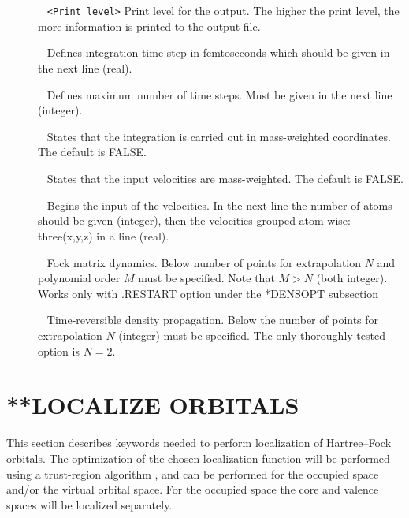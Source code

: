 \begin{description}
\item[]\verb| | \newline
\verb|<Print level>|\newline
Print level for the output. The higher the print level, the more information
is printed to the output file.
\item[]\verb| | \newline
Defines integration time step in femtoseconds which should be given in the next line (real).
\item[]\verb| | \newline
Defines maximum number of time steps. Must be given in the next line (integer).
\item[]\verb| | \newline 
States that the integration is carried out in mass-weighted coordinates. The default is FALSE.
\item[]\verb| | \newline 
States that the input velocities are mass-weighted. The default is FALSE.
\item[]\verb| | \newline 
Begins the input of the velocities. In the next line the number of atoms should be given (integer),
then the velocities grouped atom-wise: three(x,y,z) in a line (real).
\item[]\verb| | \newline 
Fock matrix dynamics. Below number of points for extrapolation $N$ and polynomial order $M$ must
be specified. Note that $M>N$ (both integer). Works only with .RESTART option under the *DENSOPT subsection
\item[]\verb| | \newline 
Time-reversible density propagation. Below the number of points for extrapolation $N$ (integer)  must be specified.
The only thoroughly tested option is $N=2$.

\end{description}


\section{**LOCALIZE ORBITALS}\label{subsec:orbloc}

This section describes keywords needed to perform localization of Hartree--Fock orbitals. The optimization of the
chosen localization function will be performed using a trust-region algorithm \cite{hoyvik:TRM}, and can be performed for  the occupied space and/or the virtual orbital space. For the occupied space the core and valence spaces will be localized separately.  


